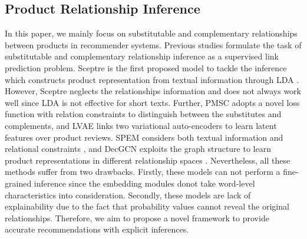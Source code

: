 \documentclass[review]{elsarticle}
\begin{document}
\begin{sloppypar}
\subsection{Product Relationship Inference}
In this paper, we mainly focus on substitutable and complementary relationships  between products in recommender systems. %
Previous studies formulate the task of substitutable and complementary relationship inference as a supervised link prediction problem. Sceptre is the first proposed model to tackle the inference which constructs product representation from textual information through LDA \cite{mcauley2015inferringSceptre}.
However, Sceptre neglects the relationships information and does not always work well since LDA is not effective for short texts. Further, PMSC adopts a novel loss function with relation constraints to distinguish between the substitutes and complements\cite{DBLP:conf/wsdm/WangJRTY18_JD}, and LVAE links two variational auto-encoders to learn  latent features over product reviews\cite{rakesh2019LVAE}. SPEM considers both textual information and relational constraints \cite{zhang2019inferring_SPEM}, and DecGCN exploits the graph structure to learn product  representations in different relationship spaces \cite{cikm2020}. Nevertheless, all these methods suffer from two drawbacks. Firstly, these models can not perform a fine-grained inference since the embedding modules donot take word-level characteristics into consideration. Secondly, these models are lack of explainability due to the fact that probability values cannot reveal the original relationships. Therefore, we aim to propose a novel framework  to provide accurate recommendations with explicit inferences.

\end{sloppypar}
\end{document}
